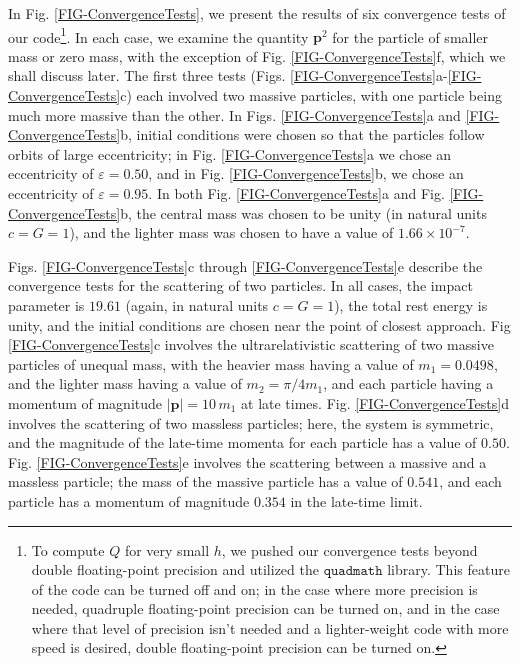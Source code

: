 \documentclass[aps,onecolumn,notitlepage,eqsecnum,nofootinbib,floatfix,superscriptaddress]{revtex4-1}
\begin{document}
In Fig. \ref{FIG-ConvergenceTests}, we present the results of six convergence tests of our code\footnote{To compute $Q$ for very small $h$, we pushed our convergence tests beyond double floating-point precision and utilized the $\mathtt{quadmath}$ library.  This feature of the code can be turned off and on; in the case where more precision is needed, quadruple floating-point precision can be turned on, and in the case where that level of precision isn't needed and a lighter-weight code with more speed is desired, double floating-point precision can be turned on.}. In each case, we examine the quantity $\textbf{p}^2$ for the particle of smaller mass or zero mass, with the exception of Fig. \ref{FIG-ConvergenceTests}f, which we shall discuss later. The first three tests (Figs. \ref{FIG-ConvergenceTests}a-\ref{FIG-ConvergenceTests}c) each involved two massive particles, with one particle being much more massive than the other. In Figs. \ref{FIG-ConvergenceTests}a and \ref{FIG-ConvergenceTests}b, initial conditions were chosen so that the particles follow orbits of large eccentricity; in Fig. \ref{FIG-ConvergenceTests}a we chose an eccentricity of $\varepsilon=0.50$, and in Fig. \ref{FIG-ConvergenceTests}b, we chose an eccentricity of $\varepsilon=0.95$. In both Fig. \ref{FIG-ConvergenceTests}a and Fig. \ref{FIG-ConvergenceTests}b, the central mass was chosen to be unity (in natural units $c=G=1$), and the lighter mass was chosen to have a value of $1.66 \times 10^{-7}$.

Figs. \ref{FIG-ConvergenceTests}c through \ref{FIG-ConvergenceTests}e describe the convergence tests for the scattering of two particles. In all cases, the impact parameter is $19.61$ (again, in natural units $c=G=1$), the total rest energy is unity, and the initial conditions are chosen near the point of closest approach. Fig \ref{FIG-ConvergenceTests}c involves the ultrarelativistic scattering of two massive particles of unequal mass, with the heavier mass having a value of $m_1=0.0498$, and the lighter mass having a value of $m_2= \pi/4 m_1$, and each particle having a momentum of magnitude $|\textbf{p}|=10 \, m_1$ at late times. Fig. \ref{FIG-ConvergenceTests}d involves the scattering of two massless particles; here, the system is symmetric, and the magnitude of the late-time momenta for each particle has a value of $0.50$. Fig. \ref{FIG-ConvergenceTests}e involves the scattering between a massive and a massless particle; the mass of the massive particle has a value of $0.541$, and each particle has a momentum of magnitude $0.354$ in the late-time limit.
 
\end{document}
